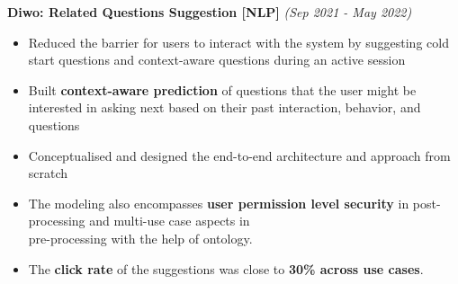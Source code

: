 \documentclass[a4paper,10pt]{article}
\newcommand{\isep}{-2 pt}
\begin{document}
\begin{itemize}
{{\begin{itemize}
    \end{itemize}
    
\vspace{12pt}
\item \textbf{Diwo: Related Questions Suggestion [NLP]} \hfill {\emph{(Sep 2021 - May 2022)}}
    \\[-0.6cm]
    \begin{itemize}\itemsep \isep
    	\item Reduced the barrier for users to interact with the system by suggesting cold start questions and context-aware questions during an active session 
        \item Built \textbf{context-aware prediction} of questions that the user might be interested in asking next based on their past interaction, behavior, and questions
        \item Conceptualised and designed the end-to-end architecture and approach from scratch 
        \item The modeling also encompasses \textbf{user permission level security} in post-processing and multi-use case aspects in \\ pre-processing with the help of ontology. 
        \item The \textbf{click rate} of the suggestions was close to \textbf{30\% across use cases}.
        \\ [-0.5cm]
    \end{itemize}


}}
\end{itemize}
\end{document}
